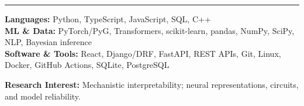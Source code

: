 \documentclass[10pt,letterpaper]{article}
\newcommand{\ressection}[1]{\par\vspace{8pt}{\large\scshape #1}\par\vspace{2pt}\hrule\vspace{5pt}}
\begin{document}
\ressection{Technical Skills}
{\small\textbf{Languages:} Python, TypeScript, JavaScript, SQL, C++}\\[2pt]
{\small\textbf{ML \& Data:} PyTorch/PyG, Transformers, scikit-learn, pandas, NumPy, SciPy, NLP, Bayesian inference}\\[2pt]
{\small\textbf{Software \& Tools:} React, Django/DRF, FastAPI, REST APIs, Git, Linux, Docker, GitHub Actions, SQLite, PostgreSQL}
\par\vspace{4pt}
{\small\textbf{Research Interest:} Mechanistic interpretability; neural representations, circuits, and model reliability.}
\end{document}
